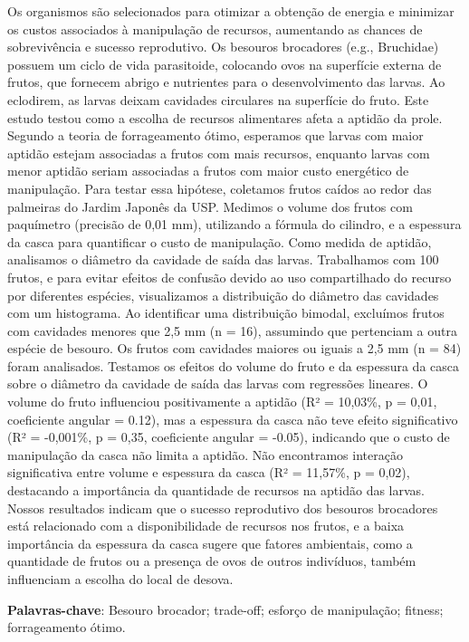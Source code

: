 \documentclass[
]{book}
\begin{document}
Os organismos são selecionados para otimizar a obtenção de energia e minimizar os custos associados à manipulação de recursos, aumentando as chances de sobrevivência e sucesso reprodutivo. Os besouros brocadores (e.g., Bruchidae) possuem um ciclo de vida parasitoide, colocando ovos na superfície externa de frutos, que fornecem abrigo e nutrientes para o desenvolvimento das larvas. Ao eclodirem, as larvas deixam cavidades circulares na superfície do fruto. Este estudo testou como a escolha de recursos alimentares afeta a aptidão da prole. Segundo a teoria de forrageamento ótimo, esperamos que larvas com maior aptidão estejam associadas a frutos com mais recursos, enquanto larvas com menor aptidão seriam associadas a frutos com maior custo energético de manipulação. Para testar essa hipótese, coletamos frutos caídos ao redor das palmeiras do Jardim Japonês da USP. Medimos o volume dos frutos com paquímetro (precisão de 0,01 mm), utilizando a fórmula do cilindro, e a espessura da casca para quantificar o custo de manipulação. Como medida de aptidão, analisamos o diâmetro da cavidade de saída das larvas. Trabalhamos com 100 frutos, e para evitar efeitos de confusão devido ao uso compartilhado do recurso por diferentes espécies, visualizamos a distribuição do diâmetro das cavidades com um histograma. Ao identificar uma distribuição bimodal, excluímos frutos com cavidades menores que 2,5 mm (n = 16), assumindo que pertenciam a outra espécie de besouro. Os frutos com cavidades maiores ou iguais a 2,5 mm (n = 84) foram analisados. Testamos os efeitos do volume do fruto e da espessura da casca sobre o diâmetro da cavidade de saída das larvas com regressões lineares. O volume do fruto influenciou positivamente a aptidão (R² = 10,03\%, p = 0,01, coeficiente angular = 0.12), mas a espessura da casca não teve efeito significativo (R² = -0,001\%, p = 0,35, coeficiente angular = -0.05), indicando que o custo de manipulação da casca não limita a aptidão. Não encontramos interação significativa entre volume e espessura da casca (R² = 11,57\%, p = 0,02), destacando a importância da quantidade de recursos na aptidão das larvas. Nossos resultados indicam que o sucesso reprodutivo dos besouros brocadores está relacionado com a disponibilidade de recursos nos frutos, e a baixa importância da espessura da casca sugere que fatores ambientais, como a quantidade de frutos ou a presença de ovos de outros indivíduos, também influenciam a escolha do local de desova.

\textbf{Palavras-chave}: Besouro brocador; trade-off; esforço de manipulação; fitness; forrageamento ótimo.
\end{document}
